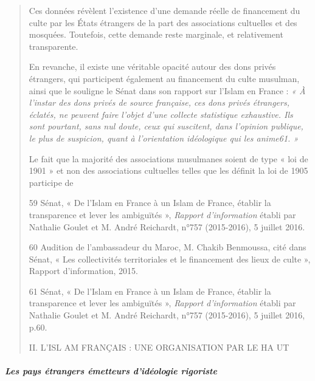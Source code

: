 \begin{quote}
Ces données révèlent l'existence d'une demande réelle de financement du
culte par les États étrangers de la part des associations cultuelles et
des mosquées. Toutefois, cette demande reste marginale, et relativement
transparente.

En revanche, il existe une véritable opacité autour des dons privés
étrangers, qui participent également au financement du culte musulman,
ainsi que le souligne le Sénat dans son rapport sur l'Islam en France :
\emph{« À l'instar des dons privés de source française, ces dons privés
étrangers, éclatés, ne peuvent faire l'objet d'une collecte statistique
exhaustive. Ils sont pourtant, sans nul doute, ceux qui suscitent, dans
l'opinion publique, le plus de suspicion, quant à l'orientation
idéologique qui les anime61. »}

Le fait que la majorité des associations musulmanes soient de type « loi
de 1901 » et non des associations cultuelles telles que les définit la
loi de 1905 participe de

59 Sénat, « De l'Islam en France à un Islam de France, établir la
transparence et lever les ambiguïtés », \emph{Rapport d'information}
établi par Nathalie Goulet et M. André Reichardt, n°757 (2015-2016), 5
juillet 2016.

60 Audition de l'ambassadeur du Maroc, M. Chakib Benmoussa, cité dans
Sénat, « Les collectivités territoriales et le financement des lieux de
culte », Rapport d'information, 2015.

61 Sénat, « De l'Islam en France à un Islam de France, établir la
transparence et lever les ambiguïtés », \emph{Rapport d'information}
établi par Nathalie Goulet et M. André Reichardt, n°757 (2015-2016), 5
juillet 2016, p.60.

II. L'ISL AM FRANÇAIS : UNE ORGANISATION PAR LE HA UT
\end{quote}

\hypertarget{les-pays-uxe9trangers-uxe9metteurs-diduxe9ologie-rigoriste}{%
\subparagraph{Les pays étrangers émetteurs d'idéologie
rigoriste}\label{les-pays-uxe9trangers-uxe9metteurs-diduxe9ologie-rigoriste}}

